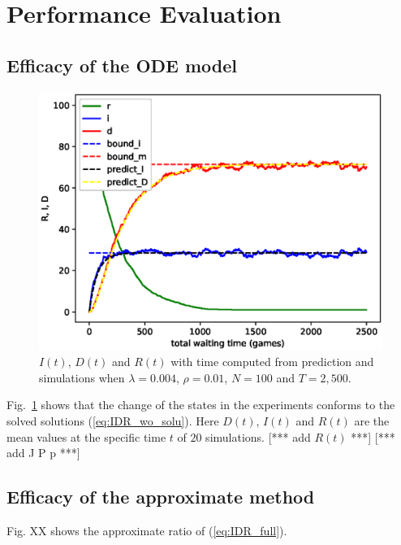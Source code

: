 \section{Performance Evaluation}
\subsection{Efficacy of the ODE model}
\label{subsec:pe_valid}
\begin{figure}
  \includegraphics[width=.45\textwidth]{fig/twohop_without_detection.eps}
  \caption{$I(t)$, $D(t)$ and $R(t)$ with time computed from prediction and simulations when $\lambda = 0.004$, $\rho = 0.01$, $N=100$ and $T=2,500$.}
  \label{fig:twohop_predict_wod}
\end{figure}
Fig.~\ref{fig:twohop_predict_wod} shows that the change of the states
in the experiments conforms to the solved solutions (\ref{eq:IDR_wo_solu}).
Here $D(t)$, $I(t)$ and $R(t)$ are the mean values 
at the specific time $t$ of $20$ simulations.
[*** add $R(t)$ ***]
[*** add J P p ***]

\subsection{Efficacy of the approximate method}
Fig. XX shows the approximate ratio of (\ref{eq:IDR_full}).

